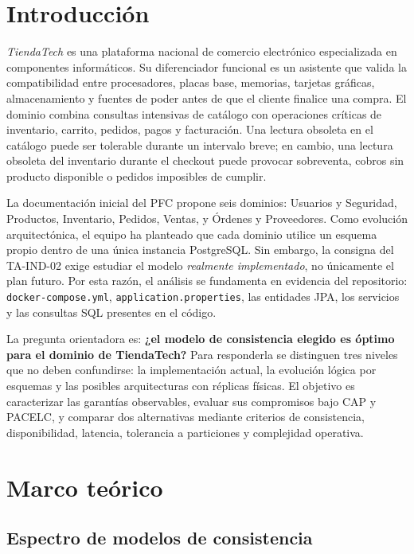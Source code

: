 \documentclass[11pt,a4paper]{article}
\newcommand{\TiendaTech}{\textit{TiendaTech}}
\begin{document}
\section{Introducción}

\TiendaTech{} es una plataforma nacional de comercio electrónico especializada en componentes informáticos. Su diferenciador funcional es un asistente que valida la compatibilidad entre procesadores, placas base, memorias, tarjetas gráficas, almacenamiento y fuentes de poder antes de que el cliente finalice una compra. El dominio combina consultas intensivas de catálogo con operaciones críticas de inventario, carrito, pedidos, pagos y facturación. Una lectura obsoleta en el catálogo puede ser tolerable durante un intervalo breve; en cambio, una lectura obsoleta del inventario durante el checkout puede provocar sobreventa, cobros sin producto disponible o pedidos imposibles de cumplir.

La documentación inicial del PFC propone seis dominios: Usuarios y Seguridad, Productos, Inventario, Pedidos, Ventas, y Órdenes y Proveedores. Como evolución arquitectónica, el equipo ha planteado que cada dominio utilice un esquema propio dentro de una única instancia PostgreSQL. Sin embargo, la consigna del TA-IND-02 exige estudiar el modelo \emph{realmente implementado}, no únicamente el plan futuro. Por esta razón, el análisis se fundamenta en evidencia del repositorio: \texttt{docker-compose.yml}, \texttt{application.properties}, las entidades JPA, los servicios y las consultas SQL presentes en el código.

La pregunta orientadora es: \textbf{¿el modelo de consistencia elegido es óptimo para el dominio de TiendaTech?} Para responderla se distinguen tres niveles que no deben confundirse: la implementación actual, la evolución lógica por esquemas y las posibles arquitecturas con réplicas físicas. El objetivo es caracterizar las garantías observables, evaluar sus compromisos bajo CAP y PACELC, y comparar dos alternativas mediante criterios de consistencia, disponibilidad, latencia, tolerancia a particiones y complejidad operativa.

\section{Marco teórico}

\subsection{Espectro de modelos de consistencia}
\end{document}
